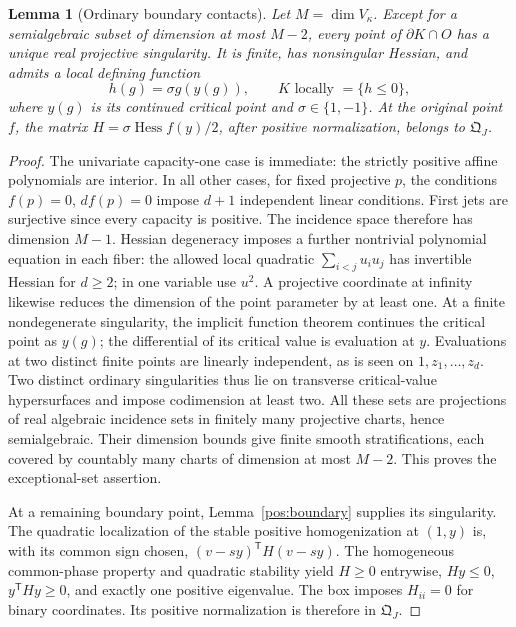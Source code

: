 \documentclass[reqno]{amsart}
\newtheorem{lemma}[theorem]{Lemma}
\theoremstyle{definition}
\theoremstyle{remark}
\begin{document}
\begin{lemma}[Ordinary boundary contacts]\label{pos:ordinary}
Let \(M=\dim V_\kappa\).  Except for a semialgebraic subset of dimension at most
\(M-2\), every point of \(\partial K\cap O\) has a unique real projective
singularity.  It is finite, has nonsingular Hessian, and admits a local defining
function
\[
 h(g)=\sigma g(y(g)),\qquad K\text{ locally }=\{h\le0\},
\]
where \(y(g)\) is its continued critical point and \(\sigma\in\{1,-1\}\).
At the original point \(f\), the matrix
\(H=\sigma\operatorname{Hess}f(y)/2\), after positive normalization, belongs
to \(\mathfrak Q_J\).
\end{lemma}
\begin{proof}
The univariate capacity-one case is immediate: the strictly positive affine
polynomials are interior.  In all other cases, for fixed projective \(p\), the
conditions \(f(p)=0\), \(df(p)=0\) impose \(d+1\) independent linear conditions.
First jets are surjective since every capacity is positive.  The incidence space
therefore has dimension \(M-1\).
Hessian degeneracy imposes a further nontrivial polynomial equation in each fiber:
the allowed local quadratic \(\sum_{i<j}u_iu_j\) has invertible Hessian for
\(d\ge2\); in one variable use \(u^2\).
A projective coordinate at infinity likewise reduces the dimension of the point
parameter by at least one.  At a finite nondegenerate singularity, the implicit
function theorem continues the critical point as \(y(g)\); the differential of
its critical value is evaluation at \(y\).  Evaluations at two distinct finite
points are linearly independent, as is seen on \(1,z_1,\ldots,z_d\).
Two distinct ordinary singularities thus lie on transverse critical-value
hypersurfaces and impose codimension at least two.
All these sets are projections of real algebraic incidence sets in finitely many
projective charts, hence semialgebraic.  Their dimension bounds give finite
smooth stratifications, each covered by countably many charts of dimension at
most \(M-2\).  This proves the exceptional-set assertion.

At a remaining boundary point, Lemma~\ref{pos:boundary} supplies its singularity.
The quadratic localization of the stable positive homogenization at \((1,y)\)
is, with its common sign chosen,
\((v-sy)^{\mathsf T}H(v-sy)\).
The homogeneous common-phase property and quadratic stability yield
\(H\ge0\) entrywise, \(Hy\le0\), \(y^{\mathsf T}Hy\ge0\), and exactly one
positive eigenvalue.  The box imposes \(H_{ii}=0\) for binary coordinates.
Its positive normalization is therefore in \(\mathfrak Q_J\).


\end{proof}
\end{document}
